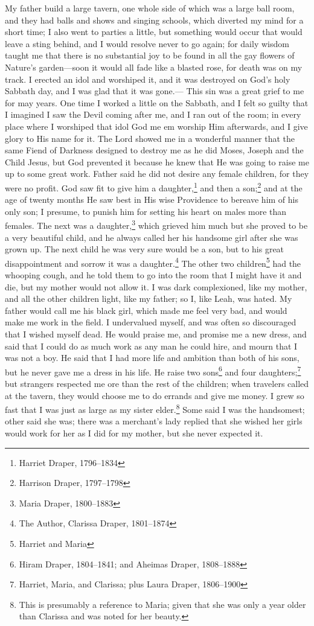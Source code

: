 My father build a large tavern, one whole side of which was a large ball room, and they had balls and shows and singing schools, which diverted my mind for a short time; I also went to parties a little, but something would occur that would leave a sting behind, and I would resolve never to go again; for daily wisdom taught me that there is no substantial joy to be found in all the gay flowers of Nature's garden---soon it would all fade like a blasted rose, for death was on my track.
I erected an idol and worshiped it, and it was destroyed on God's holy Sabbath day, and I was glad that it was gone.---
This sin was a great grief to me for may years.
One time I worked a little on the Sabbath, and I felt so guilty that I imagined I saw the Devil coming after me, and I ran out of the room; in every place where I worshiped that idol God me em worship Him afterwards, and I give glory to His name for it.
The Lord showed me in a wonderful manner that the same Fiend of Darkness designed to destroy me as he did Moses, Joseph and the Child Jesus, but God prevented it because he knew that He was going to raise me up to some great work.
Father said he did not desire any female children, for they were no profit.
God saw fit to give him a daughter,\footnote{Harriet Draper, 1796--1834} and then a son;\footnote{Harrison Draper, 1797--1798} and at the age of twenty months He saw best in His wise Providence to bereave him of his only son; I presume, to punish him for setting his heart on males more than females.
The next was a daughter,\footnote{Maria Draper, 1800--1883} which grieved him much but she proved to be a very beautiful child, and he always called her his handsome girl after she was grown up.
The next child he was very sure would be a son, but to his great disappointment and sorrow it was a daughter.\footnote{The Author, Clarissa Draper, 1801--1874}
The other two children\footnote{Harriet and Maria} had the whooping cough, and he told them to go into the room that I might have it and die, but my mother would not allow it.
I was dark complexioned, like my mother, and all the other children light, like my father; so I, like Leah, was hated.
My father would call me his black girl, which made me feel very bad, and would make me work in the field.
I undervalued myself, and was often so discouraged that I wished myself dead.
He would praise me, and promise me a new dress, and said that I could do as much work as any man he could hire, and mourn that I was not a boy.
He said that I had more life and ambition than both of his sons, but he never gave me a dress in his life.
He raise two sons\footnote{Hiram Draper, 1804--1841; and Aheimas Draper, 1808--1888} and four daughters;\footnote{Harriet, Maria, and Clarissa; plus Laura Draper, 1806--1900} but strangers respected me ore than the rest of the children; when travelers called at the tavern, they would choose me to do errands and give me money.
I grew so fast that I was just as large as my sister elder.\footnote{This is presumably a reference to Maria; given that she was only a year older than Clarissa and was noted for her beauty.}
Some said I was the handsomest; other said she was; there was a merchant's lady replied that she wished her girls would work for her as I did for my mother, but she never expected it.

